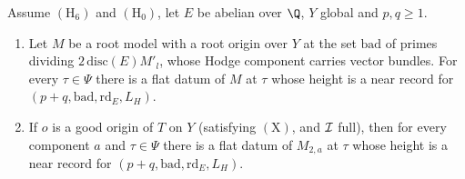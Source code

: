 \begin{proposition}\label{pf:volthm:prop:flatdata}
Assume $(\mathrm{H}_6)$ and $(\mathrm{H}_0)$, let $E$ be abelian over $\Q$, $Y$ global and $p,q\ge1$.
\begin{enumerate}[label=(\alph*)]
\item Let $M$ be a root model with a root origin over $Y$ at the set $\mathrm{bad}$ of primes dividing
$2\,\mathrm{disc}(E)M'_l$, whose Hodge component carries vector bundles. For every $\tau\in\Psi$ there is a flat datum
of $M$ at $\tau$ whose height is a near record for $(p+q,\mathrm{bad},\mathrm{rd}_E,L_H)$.
\item If $o$ is a good origin of $T$ on $Y$ (satisfying $(\mathrm{X})$, and $\mathcal{I}$ full), then for every component
$a$ and $\tau\in\Psi$ there is a flat datum of $M_{2,a}$ at $\tau$ whose height is a near record for
$(p+q,\mathrm{bad},\mathrm{rd}_E,L_H)$.
\end{enumerate}
\end{proposition}

